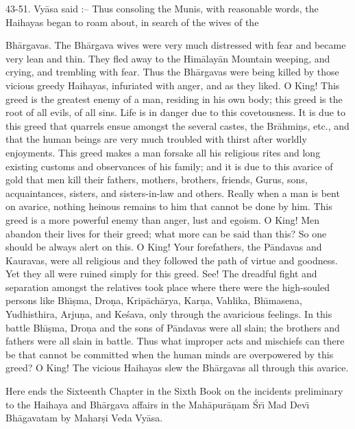 43-51. Vy\=asa said :-- Thus consoling the Munis, with reasonable words, the Haihayas began to roam about, in search of the wives of the

Bh\=argavas. The Bh\=argava wives were very much distressed with fear and became very lean and thin. They fled away to the Him\=alay\=an Mountain weeping, and crying, and trembling with fear. Thus the Bh\=argavas were being killed by those vicious greedy Haihayas, infuriated with anger, and as they liked. O King! This greed is the greatest enemy of a man, residing in his own body; this greed is the root of all evils, of all sins. Life is in danger due to this covetousness. It is due to this greed that quarrels ensue amongst the several castes, the Br\=ahmi\d{n}s, etc., and that the human beings are very much troubled with thirst after worldly enjoyments. This greed makes a man forsake all his religious rites and long existing customs and observances of his family; and it is due to this avarice of gold that men kill their fathers, mothers, brothers, friends, Gurus, sons, acquaintances, sisters, and sisters-in-law and others. Really when a man is bent on avarice, nothing heinous remains to him that cannot be done by him. This greed is a more powerful enemy than anger, lust and egoism. O King! Men abandon their lives for their greed; what more can be said than this? So one should be always alert on this. O King! Your forefathers, the P\=andavas and Kauravas, were all religious and they followed the path of virtue and goodness. Yet they all were ruined simply for this greed. See! The dreadful fight and separation amongst the relatives took place where there were the high-souled persons like Bh\={\i}\d{s}ma, Dro\d{n}a, Krip\=ach\=arya, Kar\d{n}a, Vahlika, Bh\={\i}masena, Yudhisthira, Arju\d{n}a, and Ke\'sava, only through the avaricious feelings. In this battle Bh\={\i}\d{s}ma, Dro\d{n}a and the sons of P\=andavas were all slain; the brothers and fathers were all slain in battle. Thus what improper acts and mischiefs can there be that cannot be committed when the human minds are overpowered by this greed? O King! The vicious Haihayas slew the Bh\=argavas all through this avarice.

Here ends the Sixteenth Chapter in the Sixth Book on the incidents preliminary to the Haihaya and Bh\=argava affairs in the Mah\=apur\=a\d{n}am \'Sr\={\i} Mad Dev\={\i} Bh\=agavatam by Mahar\d{s}i Veda Vy\=asa.



